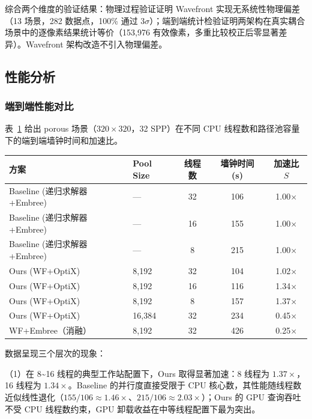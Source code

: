 综合两个维度的验证结果：物理过程验证证明 Wavefront 实现无系统性物理偏差（13 场景，282 数据点，100\% 通过 $3\sigma$）；端到端统计检验证明两架构在真实耦合场景中的逐像素结果统计等价（153{,}976 有效像素，多重比较校正后零显著差异）。Wavefront 架构改造不引入物理偏差。

\subsection{性能分析}

\subsubsection{端到端性能对比}

表~\ref{tab:performance-comparison} 给出 porous 场景（$320 \times 320$，32 SPP）在不同 CPU 线程数和路径池容量下的端到端墙钟时间和加速比。

\begin{table}[htbp]
  \centering
  \label{tab:performance-comparison}
  \small
  \begin{tabular}{llccc}
    \toprule
    方案 & Pool Size & 线程数 & 墙钟时间 (s) & 加速比 $S$ \\
    \midrule
    Baseline (递归求解器+Embree)  & —      & 32 & 106 & 1.00$\times$ \\
    Baseline (递归求解器+Embree)  & —      & 16 & 155 & 1.00$\times$ \\
    Baseline (递归求解器+Embree)  & —      & 8  & 215 & 1.00$\times$ \\
    \midrule
    Ours (WF+OptiX)        & 8{,}192  & 32 & 104 & 1.02$\times$ \\
    Ours (WF+OptiX)        & 8{,}192  & 16 & 116 & 1.34$\times$ \\
    Ours (WF+OptiX)        & 8{,}192  & 8  & 157 & 1.37$\times$ \\
    \midrule
    Ours (WF+OptiX)        & 16{,}384 & 32 & 234 & 0.45$\times$ \\
    \midrule
    WF+Embree（消融）       & 8{,}192  & 32 & 426 & 0.25$\times$ \\
    \bottomrule
  \end{tabular}
\end{table}

数据呈现三个层次的现象：

（1）在 8\textasciitilde 16 线程的典型工作站配置下，Ours 取得显著加速：8 线程为 $1.37\times$，16 线程为 $1.34\times$。Baseline 的并行度直接受限于 CPU 核心数，其性能随线程数近似线性退化（$155/106 \approx 1.46\times$、$215/106 \approx 2.03\times$）；Ours 的 GPU 查询吞吐不受 CPU 线程数约束，GPU 卸载收益在中等线程配置下最为突出。


